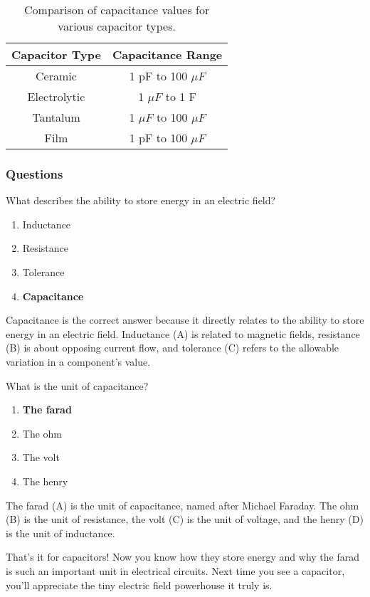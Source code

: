\begin{table}[h]
    \centering
    \begin{tabular}{|c|c|}
        \hline
        \textbf{Capacitor Type} & \textbf{Capacitance Range} \\
        \hline
        Ceramic & 1 pF to 100 \(\mu F\) \\
        Electrolytic & 1 \(\mu F\) to 1 F \\
        Tantalum & 1 \(\mu F\) to 100 \(\mu F\) \\
        Film & 1 pF to 100 \(\mu F\) \\
        \hline
    \end{tabular}
    \caption{Comparison of capacitance values for various capacitor types.}
    \label{tab:capacitance-values}
\end{table}

\subsubsection*{Questions}

\begin{tcolorbox}[colback=gray!10!white,colframe=black!75!black,title={T5C01}]
    What describes the ability to store energy in an electric field?
    \begin{enumerate}[label=\Alph*),noitemsep]
        \item Inductance
        \item Resistance
        \item Tolerance
        \item \textbf{Capacitance}
    \end{enumerate}
\end{tcolorbox}

Capacitance is the correct answer because it directly relates to the ability to store energy in an electric field. Inductance (A) is related to magnetic fields, resistance (B) is about opposing current flow, and tolerance (C) refers to the allowable variation in a component's value.

\begin{tcolorbox}[colback=gray!10!white,colframe=black!75!black,title={T5C02}]
    What is the unit of capacitance?
    \begin{enumerate}[label=\Alph*),noitemsep]
        \item \textbf{The farad}
        \item The ohm
        \item The volt
        \item The henry
    \end{enumerate}
\end{tcolorbox}

The farad (A) is the unit of capacitance, named after Michael Faraday. The ohm (B) is the unit of resistance, the volt (C) is the unit of voltage, and the henry (D) is the unit of inductance.

That's it for capacitors! Now you know how they store energy and why the farad is such an important unit in electrical circuits. Next time you see a capacitor, you'll appreciate the tiny electric field powerhouse it truly is.
